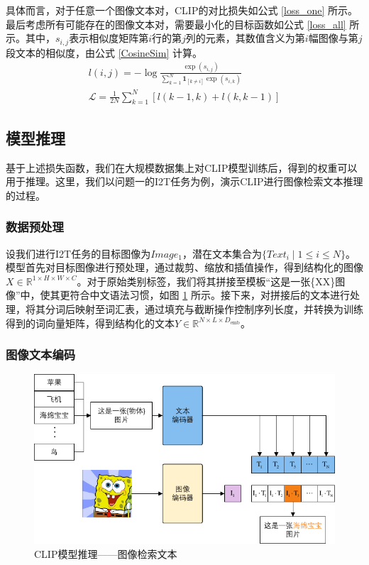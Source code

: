 \documentclass[a4paper]{zreport}
\begin{document}
具体而言，对于任意一个图像文本对，CLIP的对比损失如公式 \eqref{loss_one} 所示。最后考虑所有可能存在的图像文本对，需要最小化的目标函数如公式 \eqref{loss_all} 所示。其中，$s_{i,j}$表示相似度矩阵第$i$行的第$j$列的元素，其数值含义为第$i$幅图像与第$j$段文本的相似度，由公式 \eqref{CosineSim} 计算。
\begin{gather}
l(i,j)=-\log\frac{\exp(s_{i,j})}{\sum_{k=1}^{N} \mathbf{1}_{\left[k \ne i\right]} \exp(s_{i,k})}\label{loss_one}\\
\mathcal{L}=\frac{1}{2N}\sum_{k=1}^N[l(k-1,k)+l(k,k-1)]\label{loss_all}
\end{gather}


\subsection{模型推理} \label{infer}

基于上述损失函数，我们在大规模数据集上对CLIP模型训练后，得到的权重可以用于推理。这里，我们以问题一的I2T任务为例，演示CLIP进行图像检索文本推理的过程。

\subsubsection{数据预处理}

设我们进行I2T任务的目标图像为$Image_1$，潜在文本集合为$\{Text_i \mid 1 \le i \le N\}$。模型首先对目标图像进行预处理，通过裁剪、缩放和插值操作，得到结构化的图像 $X \in \mathbb{R}^{1 \times H \times W \times C}$。对于原始类别标签，我们将其拼接至模板“这是一张\{XX\}图像”中，使其更符合中文语法习惯，如图 \ref{fig:clip2} 所示。接下来，对拼接后的文本进行处理，将其分词后映射至词汇表，通过填充与截断操作控制序列长度，并转换为训练得到的词向量矩阵，得到结构化的文本$Y \in \mathbb{R}^{N \times L \times D_\mathrm{emb}}$。

\subsubsection{图像文本编码}

\begin{figure}[h]
\centering
\includegraphics[width=0.9\linewidth]{figures/clip2}
\caption{CLIP模型推理——图像检索文本}
\label{fig:clip2}
\end{figure}
\end{document}
